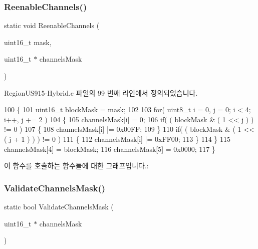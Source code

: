 \subsubsection{\texorpdfstring{Reenable\+Channels()}{ReenableChannels()}}
{\footnotesize\ttfamily static void Reenable\+Channels (\begin{DoxyParamCaption}\item[{uint16\+\_\+t}]{mask,  }\item[{uint16\+\_\+t $\ast$}]{channels\+Mask }\end{DoxyParamCaption})\hspace{0.3cm}{\ttfamily [static]}}



Region\+U\+S915-\/\+Hybrid.\+c 파일의 99 번째 라인에서 정의되었습니다.


\begin{DoxyCode}
100 \{
101     uint16\_t blockMask = mask;
102 
103     \textcolor{keywordflow}{for}( uint8\_t i = 0, j = 0; i < 4; i++, j += 2 )
104     \{
105         channelsMask[i] = 0;
106         \textcolor{keywordflow}{if}( ( blockMask & ( 1 << j ) ) != 0 )
107         \{
108             channelsMask[i] |= 0x00FF;
109         \}
110         \textcolor{keywordflow}{if}( ( blockMask & ( 1 << ( j + 1 ) ) ) != 0 )
111         \{
112             channelsMask[i] |= 0xFF00;
113         \}
114     \}
115     channelsMask[4] = blockMask;
116     channelsMask[5] = 0x0000;
117 \}
\end{DoxyCode}
이 함수를 호출하는 함수들에 대한 그래프입니다.\+:
\mbox{\label{_region_u_s915-_hybrid_8c_a15a15fb81475f8a2ff4c6c5a60aa291d}} 
\subsubsection{\texorpdfstring{Validate\+Channels\+Mask()}{ValidateChannelsMask()}}
{\footnotesize\ttfamily static bool Validate\+Channels\+Mask (\begin{DoxyParamCaption}\item[{uint16\+\_\+t $\ast$}]{channels\+Mask }\end{DoxyParamCaption})\hspace{0.3cm}{\ttfamily [static]}}




